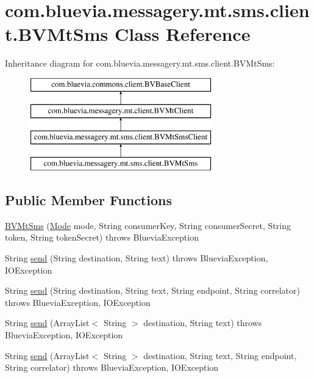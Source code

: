 \hypertarget{classcom_1_1bluevia_1_1messagery_1_1mt_1_1sms_1_1client_1_1BVMtSms}{
\section{com.bluevia.messagery.mt.sms.client.BVMtSms Class Reference}
\label{classcom_1_1bluevia_1_1messagery_1_1mt_1_1sms_1_1client_1_1BVMtSms}
}
Inheritance diagram for com.bluevia.messagery.mt.sms.client.BVMtSms:\begin{figure}[H]
\begin{center}
\leavevmode
\includegraphics[height=4.000000cm]{classcom_1_1bluevia_1_1messagery_1_1mt_1_1sms_1_1client_1_1BVMtSms}
\end{center}
\end{figure}
\subsection*{Public Member Functions}
\begin{DoxyCompactItemize}
\item 
\hyperlink{classcom_1_1bluevia_1_1messagery_1_1mt_1_1sms_1_1client_1_1BVMtSms_afd6e6b82ee89d2878ae5c04fc56453ea}{BVMtSms} (\hyperlink{classcom_1_1bluevia_1_1commons_1_1client_1_1BVBaseClient_a5f4a4a27d73a8ddd0ce450a6c7a4d1b7}{Mode} mode, String consumerKey, String consumerSecret, String token, String tokenSecret)  throws BlueviaException
\item 
String \hyperlink{classcom_1_1bluevia_1_1messagery_1_1mt_1_1sms_1_1client_1_1BVMtSms_a2346d6939234a1fd35f0027164848cf0}{send} (String destination, String text)  throws BlueviaException, IOException 
\item 
String \hyperlink{classcom_1_1bluevia_1_1messagery_1_1mt_1_1sms_1_1client_1_1BVMtSms_a0ca2c8174a4b4e42a1c33ffb86128ab0}{send} (String destination, String text, String endpoint, String correlator)  throws BlueviaException, IOException 
\item 
String \hyperlink{classcom_1_1bluevia_1_1messagery_1_1mt_1_1sms_1_1client_1_1BVMtSms_a81105e01c27ee51593c611353e4f4ec1}{send} (ArrayList$<$ String $>$ destination, String text)  throws BlueviaException, IOException 
\item 
String \hyperlink{classcom_1_1bluevia_1_1messagery_1_1mt_1_1sms_1_1client_1_1BVMtSms_a2ec5b9c551a697cd55db9359d6796817}{send} (ArrayList$<$ String $>$ destination, String text, String endpoint, String correlator)  throws BlueviaException, IOException 
\end{DoxyCompactItemize}
